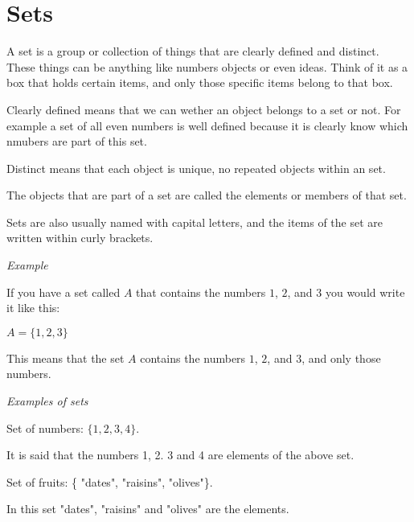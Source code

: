 \documentclass[]{book}
\begin{document}
\section{Sets}

A set is a group or collection of things that are clearly defined and distinct. These things can be anything like numbers objects or even ideas.
Think of it as 
a box that holds certain items, and only those specific items belong to that box.

Clearly defined means that we can wether an object belongs to a set or not. For example a set of all even numbers is well defined because it is 
clearly know which nmubers are part of this set.

Distinct means that each object is unique, no repeated objects within an set.

The objects that are part of a set are called the elements or members of that set. 


Sets are also usually named with capital letters, and the items of the set are written within curly brackets.

\vspace{0.5 cm}
\textit{Example}


If you have a set called $A$ that contains the numbers $1$, $2$, and $3$ you would write it like this:

\begin{center}
$A=\{1,2,3\}$
\end{center}

This means that the set $A$ contains the numbers $1$, $2$, and $3$, and only those numbers.


\vspace{0.5 cm}
\textit{Examples of sets}
\vspace{0.5 cm}

\begin{center}
Set of numbers: $\{1, 2, 3, 4\}$.
\end{center}

It is said that the numbers 1, 2. 3 and 4 are elements of the above set. 


\vspace{0.5 cm}

\begin{center}
Set of fruits: \{ "dates", "raisins", "olives"\}.

\end{center}

In this set "dates", "raisins" and "olives" are the elements.
\end{document}
